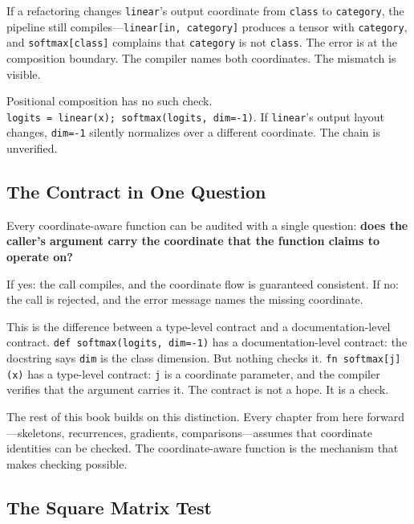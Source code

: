 \documentclass[11pt,titlepage]{article}
\begin{document}
If a refactoring changes \texttt{linear}'s output coordinate from
\texttt{class} to \texttt{category}, the pipeline still
compiles---\texttt{linear{[}in,\ category{]}} produces a tensor with
\texttt{category}, and \texttt{softmax{[}class{]}} complains that
\texttt{category} is not \texttt{class}. The error is at the composition
boundary. The compiler names both coordinates. The mismatch is visible.

Positional composition has no such check.
\texttt{logits\ =\ linear(x);\ softmax(logits,\ dim=-1)}. If
\texttt{linear}'s output layout changes, \texttt{dim=-1} silently
normalizes over a different coordinate. The chain is unverified.

\vspace{2em}

\hypertarget{the-contract-in-one-question}{%
\subsection{The Contract in One
Question}\label{the-contract-in-one-question}}

Every coordinate-aware function can be audited with a single question:
\textbf{does the caller's argument carry the coordinate that the
function claims to operate on?}

If yes: the call compiles, and the coordinate flow is guaranteed
consistent. If no: the call is rejected, and the error message names the
missing coordinate.

This is the difference between a type-level contract and a
documentation-level contract. \texttt{def\ softmax(logits,\ dim=-1)} has
a documentation-level contract: the docstring says \texttt{dim} is the
class dimension. But nothing checks it. \texttt{fn\ softmax{[}j{]}(x)}
has a type-level contract: \texttt{j} is a coordinate parameter, and the
compiler verifies that the argument carries it. The contract is not a
hope. It is a check.

The rest of this book builds on this distinction. Every chapter from
here forward---skeletons, recurrences, gradients, comparisons---assumes
that coordinate identities can be checked. The coordinate-aware function
is the mechanism that makes checking possible.

\vspace{2em}

\hypertarget{the-square-matrix-test}{%
\subsection{The Square Matrix Test}\label{the-square-matrix-test}}
\end{document}

